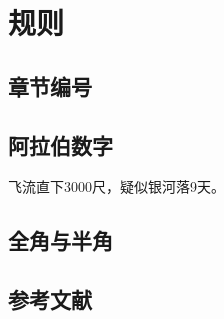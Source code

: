 \chapter{规则}


\section{章节编号}

\section{阿拉伯数字}

飞流直下3000尺，疑似银河落9天。

\section{全角与半角}

\section{参考文献}

